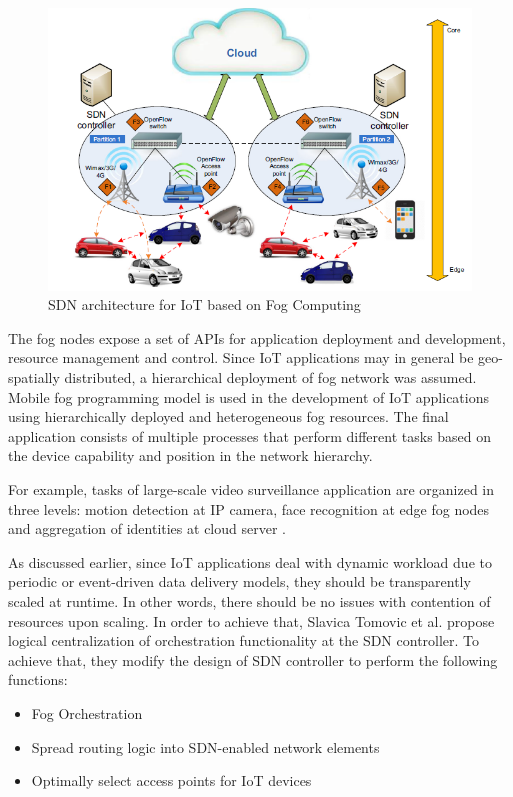 \documentclass{article}
\begin{document}
\begin{figure}[H]
	\centering
	\includegraphics[scale=0.5]{sdn.png}
	\caption{SDN architecture for IoT based on Fog Computing \cite{tomovic2017software}}
	\label{fig:sdn}
\end{figure} 

The fog nodes expose a set of APIs for application deployment and development, resource management and control. Since IoT applications may in general be geo-spatially distributed, a hierarchical deployment of fog network was assumed. 
Mobile fog programming model \cite{hong2013mobile} is used in the development of IoT applications using hierarchically deployed and heterogeneous fog resources.
The final application consists of multiple processes that perform different tasks based on the device capability and position in the network hierarchy.

For example, tasks of large-scale video surveillance application are organized in three levels: motion detection at IP camera, face recognition at edge fog nodes and aggregation of identities at cloud server \cite{tomovic2017software}.

As discussed earlier, since IoT applications deal with dynamic workload due to periodic or event-driven data delivery models, they should be transparently scaled at runtime. In other words, there should be no issues with contention of resources upon scaling. 
In order to achieve that, Slavica Tomovic et al. \cite{tomovic2017software} propose logical centralization of orchestration functionality at the SDN controller.
To achieve that, they modify the design of SDN controller to perform the following functions:

\begin{itemize}
	\item Fog Orchestration 
	\item Spread routing logic into SDN-enabled network elements
	\item Optimally select access points for IoT devices
\end{itemize}
\end{document}
